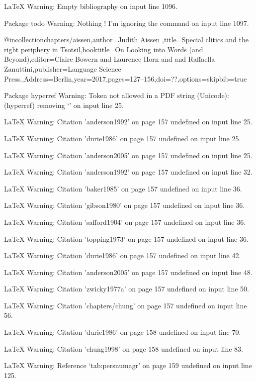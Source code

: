 LaTeX Warning: Empty bibliography on input line 1096.


Package todo Warning: Nothing \todo! I'm ignoring the \todos command on input line 1097.

@incollection{chapters/aissen,author={Judith Aissen },title={{Special clitics and the right periphery in Tsotsil}},booktitle={{On Looking into Words (and Beyond)}},editor={Claire Bowern and  Laurence Horn and  and Raffaella Zanuttini},publisher={Language Science Press.},Address={Berlin},year=2017,pages={127--156},doi={??},options={skipbib=true}}

Package hyperref Warning: Token not allowed in a PDF string (Unicode):
(hyperref)                removing `\newline' on input line 25.


LaTeX Warning: Citation 'anderson1992' on page 157 undefined on input line 25.


LaTeX Warning: Citation 'durie1986' on page 157 undefined on input line 25.


LaTeX Warning: Citation 'anderson2005' on page 157 undefined on input line 25.


LaTeX Warning: Citation 'anderson1992' on page 157 undefined on input line 32.


LaTeX Warning: Citation 'baker1985' on page 157 undefined on input line 36.


LaTeX Warning: Citation 'gibson1980' on page 157 undefined on input line 36.


LaTeX Warning: Citation 'safford1904' on page 157 undefined on input line 36.


LaTeX Warning: Citation 'topping1973' on page 157 undefined on input line 36.


LaTeX Warning: Citation 'durie1986' on page 157 undefined on input line 42.


LaTeX Warning: Citation 'anderson2005' on page 157 undefined on input line 48.


LaTeX Warning: Citation 'zwicky1977a' on page 157 undefined on input line 50.


LaTeX Warning: Citation 'chapters/chung' on page 157 undefined on input line 56.


LaTeX Warning: Citation 'durie1986' on page 158 undefined on input line 70.


LaTeX Warning: Citation 'chung1998' on page 158 undefined on input line 83.


LaTeX Warning: Reference `tab:persnumagr' on page 159 undefined on input line 125.


